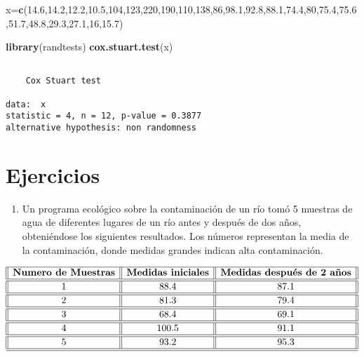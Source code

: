 \documentclass[
  a4paper,
  oneside,
  openany]{book}
\newenvironment{Shaded}{\begin{snugshade}}{\end{snugshade}}
\newcommand{\DecValTok}[1]{\textcolor[rgb]{0.00,0.00,0.81}{#1}}
\newcommand{\FloatTok}[1]{\textcolor[rgb]{0.00,0.00,0.81}{#1}}
\newcommand{\FunctionTok}[1]{\textcolor[rgb]{0.13,0.29,0.53}{\textbf{#1}}}
\newcommand{\NormalTok}[1]{#1}
\newcommand{\OtherTok}[1]{\textcolor[rgb]{0.56,0.35,0.01}{#1}}
\providecommand{\tightlist}{%
  \setlength{\itemsep}{0pt}\setlength{\parskip}{0pt}}
\begin{document}
\begin{Shaded}
\begin{Highlighting}[]
\NormalTok{x}\OtherTok{=}\FunctionTok{c}\NormalTok{(}\FloatTok{14.6}\NormalTok{,}\FloatTok{14.2}\NormalTok{,}\FloatTok{12.2}\NormalTok{,}\FloatTok{10.5}\NormalTok{,}\DecValTok{104}\NormalTok{,}\DecValTok{123}\NormalTok{,}\DecValTok{220}\NormalTok{,}\DecValTok{190}\NormalTok{,}\DecValTok{110}\NormalTok{,}\DecValTok{138}\NormalTok{,}\DecValTok{86}\NormalTok{,}\FloatTok{98.1}\NormalTok{,}\FloatTok{92.8}\NormalTok{,}\FloatTok{88.1}\NormalTok{,}\FloatTok{74.4}\NormalTok{,}\DecValTok{80}\NormalTok{,}\FloatTok{75.4}\NormalTok{,}\FloatTok{75.6}\NormalTok{,}\FloatTok{51.7}\NormalTok{,}\FloatTok{48.8}\NormalTok{,}\FloatTok{29.3}\NormalTok{,}\FloatTok{27.1}\NormalTok{,}\DecValTok{16}\NormalTok{,}\FloatTok{15.7}\NormalTok{)}


\FunctionTok{library}\NormalTok{(randtests)}
\FunctionTok{cox.stuart.test}\NormalTok{(x)}
\end{Highlighting}
\end{Shaded}

\begin{verbatim}

    Cox Stuart test

data:  x
statistic = 4, n = 12, p-value = 0.3877
alternative hypothesis: non randomness
\end{verbatim}

\hypertarget{ejercicios-4}{%
\section{Ejercicios}\label{ejercicios-4}}

\begin{enumerate}
\def\labelenumi{\arabic{enumi}.}
\tightlist
\item
  Un programa ecológico sobre la contaminación de un río tomó 5 muestras de agua de diferentes lugares de un río antes y después de dos años, obteniéndose los siguientes resultados. Los números representan la media de la contaminación, donde medidas grandes indican alta contaminación.
\end{enumerate}

\[
\begin{array}{||c| |c| |c||} 
\hline 
\textbf{Numero de Muestras} & \textbf{Medidas iniciales} & \textbf{Medidas después de 2 años}  \\  
\hline
\hline
1 &88.4& 87.1 \\
\hline
\hline
2& 81.3 &79.4 \\
\hline
\hline
3 &68.4 & 69.1 \\
\hline
\hline
4 &100.5& 91.1 \\
\hline
\hline
5 & 93.2&95.3 \\
\hline
\hline
\end{array}
\]
\end{document}
